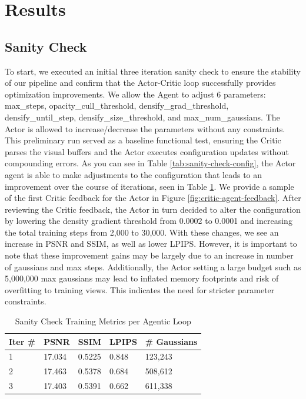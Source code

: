 \section{Results}
\label{sec:results}

\subsection{Sanity Check}
To start, we executed an initial three iteration sanity check to ensure the stability of our pipeline and confirm that the Actor-Critic loop successfully provides optimization improvements. We allow the Agent to adjust 6 parameters: max\_steps, opacity\_cull\_threshold, densify\_grad\_threshold, densify\_until\_step, densify\_size\_threshold, and max\_num\_gaussians. The Actor is allowed to increase/decrease the parameters without any constraints. This preliminary run served as a baseline functional test, ensuring the Critic parses the visual buffers and the Actor executes configuration updates without compounding errors. As you can see in Table \ref{tab:sanity-check-config}, the Actor agent is able to make adjustments to the configuration that leads to an improvement over the course of iterations, seen in Table \ref{tab:sanity-check-metrics}. We provide a sample of the first Critic feedback for the Actor in Figure \ref{fig:critic-agent-feedback}. After reviewing the Critic feedback, the Actor in turn decided to alter the configuration by lowering the density gradient threshold from 0.0002 to 0.0001 and increasing the total training steps from 2,000 to 30,000. With these changes, we see an increase in PSNR and SSIM, as well as lower LPIPS. However, it is important to note that these improvement gains may be largely due to an increase in number of gaussians and max steps. Additionally, the Actor setting a large budget such as 5,000,000 max gaussians may lead to inflated memory footprints and risk of overfitting to training views. This indicates the need for stricter parameter constraints. 

\begin{table}[h!]
\centering
\caption{Sanity Check Training Metrics per Agentic Loop}
\begin{tabular}{lllll}
\toprule
\textbf{Iter \#} & \textbf{PSNR} & \textbf{SSIM} & \textbf{LPIPS} & \textbf{\# Gaussians} \\
\midrule
1 & 17.034          & 0.5225          & 0.848          & 123,243 \\
2 & 17.463          & 0.5378          & 0.684          & 508,612 \\
3 & 17.403          & 0.5391          & 0.662          & 611,338 \\
\bottomrule
\end{tabular}
\label{tab:sanity-check-metrics}
\end{table}

